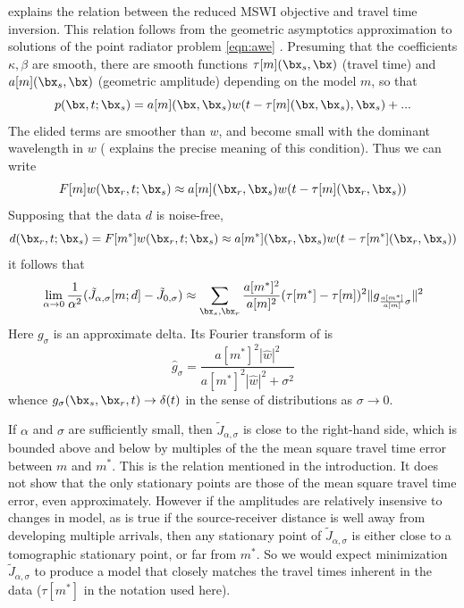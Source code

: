 \cite{Symes:24a} explains the relation between the reduced MSWI
objective and travel time inversion. This relation follows from the
geometric asymptotics approximation to solutions of the point radiator
problem \ref{eqn:awe} \cite[]{Friedlander:75}. Presuming that the
coefficients $\kappa, \beta$ are smooth, there are smooth functions
$\tau[m](\bx_s,\bx)$ (travel time) and $a[m](\bx_s,\bx)$ (geometric
amplitude) depending on the model $m$, so that
\begin{equation}
  \label{eqn:pwa}
  p(\bx,t;\bx_s) = a[m](\bx,\bx_s)w(t-\tau[m](\bx,\bx_s),\bx_s) + ...
\end{equation}
The elided terms are smoother than $w$, and become small with the
dominant wavelength in $w$ (\cite{Symes:24a} explains the precise
meaning of this condition). Thus we can write
\[
  F[m]w(\bx_r,t;\bx_s) \approx
  a[m](\bx_r,\bx_s)w(t-\tau[m](\bx_r,\bx_s))
\]
Supposing that the data $d$ is noise-free,
\[
  d(\bx_r,t;\bx_s) = F[m^*]w(\bx_r,t;\bx_s) \approx
  a[m^*](\bx_r,\bx_s)w(t-\tau[m^*](\bx_r,\bx_s))
\]
it follows that
\begin{equation}
  \label{eqn:tomo}
  \lim_{\alpha \rightarrow 0}\frac{1}{\alpha^2} (\tilde{J}_{\alpha,\sigma}[m;d]
  -\tilde{J}_{0,\sigma}) \approx \sum_{\bx_s,\bx_r} \frac{a[m^*]^2}{a[m]^2} (\tau[m^*]-\tau[m])^2\|g_{\frac{a[m^*]}{a[m]}\sigma}\|^2
\end{equation}
Here $g_{\sigma}$ is an approximate delta. Its Fourier transform of
is
\begin{equation}
  \label{eqn:gsig}
  \hat{g}_{\sigma} = \frac{a[m^*]^2 |\hat{w}|^2}{a[m^*]^2 |\hat{w}|^2
    + \sigma^2}
\end{equation}
whence $g_{\sigma}(\bx_s,\bx_r,t) \rightarrow \delta(t)$ in
the sense of distributions as $\sigma \rightarrow 0$.

If $\alpha$ and $\sigma$ are sufficiently small, then
$\tilde{J}_{\alpha,\sigma}$ is close to the right-hand side, which is bounded above and below by multiples of the the mean square travel time error between $m$ and
$m^*$.  This is the relation mentioned in the introduction. 
It does not
show that the only stationary points are those of the mean square
travel time error, even approximately. However if the amplitudes are
relatively insensive to changes in model, as is true if the
source-receiver distance is well away from developing multiple
arrivals, then any stationary point of $\tilde{J}_{\alpha,\sigma}$ is
either close to a tomographic stationary point, or far from $m^*$. So we
would expect minimization $\tilde{J}_{\alpha,\sigma}$ to produce a
model that closely matches the travel times inherent in the data
($\tau[m^*]$ in the notation used here).


